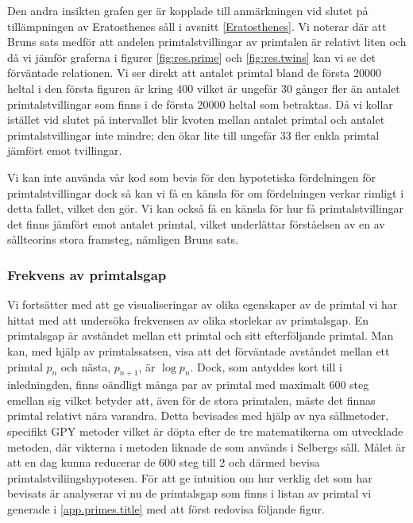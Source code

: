 Den andra insikten grafen ger är kopplade till anmärkningen vid slutet på tillämpningen av Eratosthenes såll i avsnitt \ref{Eratosthenes}. Vi noterar där att Bruns sats medför att andelen primtalstvillingar av primtalen är relativt liten och då vi jämför graferna i figurer \ref{fig:res.prime} och \ref{fig:res.twins} kan vi se det förväntade relationen.
Vi ser direkt att antalet primtal bland de första 20000 heltal i den första figuren är kring 400 vilket är ungefär 30 gånger fler än antalet primtalstvillingar som finns i de första 20000 heltal som betraktas.
Då vi kollar istället vid slutet på intervallet blir kvoten mellan antalet primtal och antalet primtalstvillingar inte mindre; den ökar lite till ungefär 33 fler enkla primtal jämfört emot tvillingar.

Vi kan inte använda vår kod som bevis för den hypotetiska fördelningen för primtalstvillingar dock så kan vi få en känsla för om fördelningen verkar rimligt i detta fallet, vilket den gör. Vi kan också få en känsla för hur få primtalstvillingar det finns jämfört emot antalet primtal, vilket underlättar förståelsen av en av sållteorins stora framsteg, nämligen Bruns sats.


\subsubsection{Frekvens av primtalsgap}

Vi fortsätter med att ge visualiseringar av olika egenskaper av de primtal vi har hittat med att undersöka frekvensen av olika storlekar av primtalsgap. 
En primtalsgap är avståndet mellan ett primtal och sitt efterföljande primtal.
Man kan, med hjälp av primtalssatsen, visa att det förväntade avståndet mellan ett primtal \(p_n\) och nästa, \(p_{n+1}\), är \(\log p_n\).
Dock, som antyddes kort till i inledningden, finns oändligt många par av primtal med maximalt 600 steg emellan sig vilket betyder att, även för de stora primtalen, måste det finnas primtal relativt nära varandra.
Detta bevisades med hjälp av nya sållmetoder, specifikt GPY metoder vilket är döpta efter de tre matematikerna om utvecklade metoden, där vikterna i metoden liknade de som används i Selbergs såll. 
Målet är att en dag kunna reducerar de 600 steg till 2 och därmed bevisa primtalstviliingshypotesen.
För att ge intuition om hur verklig det som har bevisats är analyserar vi nu de primtalsgap som finns i listan av primtal vi generade i \ref{app.primes.title} med att först redovisa följande figur.

